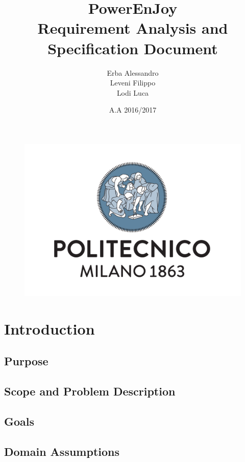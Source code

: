 \documentclass[english]{article}
\begin{document}
\begin{figure}
	\centering
	\includegraphics[scale=0.5]{logo.pdf} 
\end{figure}


\title{PowerEnJoy\\
 Requirement Analysis and Specification Document\\
}

\date{A.A 2016/2017}

\author{Erba Alessandro\\
 Leveni Filippo\\
 Lodi Luca}

\maketitle
\pagebreak{}

\tableofcontents{} \pagebreak{}

\section{Introduction}
	\subsection{Purpose }
	\subsection{Scope and Problem Description}
	\subsection{Goals}
	\subsection{Domain Assumptions }
\end{document}
